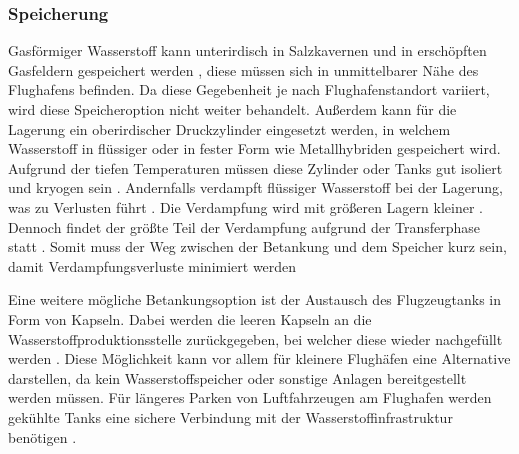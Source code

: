 \subsubsection{Speicherung}
Gasförmiger Wasserstoff kann unterirdisch in Salzkavernen 
und in erschöpften Gasfeldern gespeichert werden \cite{undertaking2022strategic}, 
diese müssen sich in unmittelbarer Nähe des Flughafens befinden. 
Da diese Gegebenheit je nach Flughafenstandort variiert, 
wird diese Speicheroption nicht weiter behandelt.
Außerdem kann für die Lagerung ein oberirdischer Druckzylinder eingesetzt werden, 
in welchem Wasserstoff in flüssiger oder in fester Form wie Metallhybriden gespeichert wird.
Aufgrund der tiefen Temperaturen müssen diese Zylinder oder Tanks gut isoliert und kryogen sein \cite{undertaking2022strategic}.
Andernfalls verdampft flüssiger Wasserstoff bei der Lagerung, 
was zu Verlusten führt \cite{undertaking2022strategic}. 
Die Verdampfung wird mit größeren Lagern kleiner \cite{colpan2022fuel}.
%
Dennoch findet der größte Teil der Verdampfung aufgrund 
der Transferphase statt \cite{undertaking2022strategic}.
Somit muss der Weg zwischen der Betankung und dem Speicher kurz sein, 
damit Verdampfungsverluste minimiert werden \cite{colpan2022fuel}

%
Eine weitere mögliche Betankungsoption ist der Austausch des Flugzeugtanks in Form von Kapseln. 
Dabei werden die leeren Kapseln an die Wasserstoffproduktionsstelle zurückgegeben, 
bei welcher diese wieder nachgefüllt werden \cite{colpan2022fuel}. 
Diese Möglichkeit kann vor allem für kleinere Flughäfen eine Alternative darstellen, 
da kein Wasserstoffspeicher oder sonstige Anlagen bereitgestellt werden müssen.
Für längeres Parken von Luftfahrzeugen am Flughafen werden gekühlte Tanks eine sichere Verbindung 
mit der Wasserstoffinfrastruktur benötigen \cite{colpan2022fuel}. %
%
%
%
%

